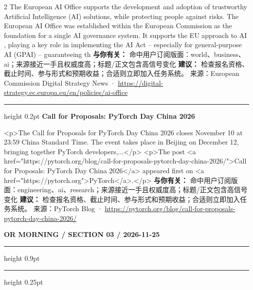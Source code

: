 \documentclass[10.5pt]{ctexart}
\begin{document}
\begin{multicols}{2}
The European AI Office supports the development and adoption of trustworthy Artificial Intelligence (AI) solutions, while protecting people against risks. The European AI Office was established within the European Commission as the foundation for a single AI governance system. It supports the EU approach to AI , playing a key role in implementing the AI Act – especially for general-purpose AI (GPAI) – guaranteeing th
\textbf{与你有关：} 命中用户订阅版面：world、business、ai；来源接近一手且权威度高；标题/正文包含高信号变化
\textbf{建议：} 检查报名资格、截止时间、参与形式和预期收益；合适则立即加入任务系统。
{\footnotesize\color{ormuted} 来源：European Commission Digital Strategy News · \url{https://digital-strategy.ec.europa.eu/en/policies/ai-office}}
\vspace{2mm}
\hrule height 0.2pt
\vspace{2mm}
{\large\bfseries Call for Proposals: PyTorch Day China 2026}\par
<p>The Call for Proposals for PyTorch Day China 2026 closes November 10 at 23:59 China Standard Time. The event takes place in Beijing on December 12, bringing together PyTorch developers,...</p> <p>The post <a href="https://pytorch.org/blog/call-for-proposals-pytorch-day-china-2026/">Call for Proposals: PyTorch Day China 2026</a> appeared first on <a href="https://pytorch.org">PyTorch</a>.</p>
\textbf{与你有关：} 命中用户订阅版面：engineering、ai、research；来源接近一手且权威度高；标题/正文包含高信号变化
\textbf{建议：} 检查报名资格、截止时间、参与形式和预期收益；合适则立即加入任务系统。
{\footnotesize\color{ormuted} 来源：PyTorch Blog · \url{https://pytorch.org/blog/call-for-proposals-pytorch-day-china-2026/}}
\end{multicols}
\newpage
{\small\bfseries OR MORNING / SECTION 03 / 2026-11-25}
\vspace{2mm}
\hrule height 0.9pt
\vspace{1.5mm}
\hrule height 0.25pt
\vspace{4mm}
\end{document}
